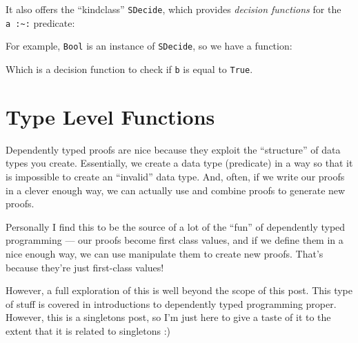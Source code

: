 \documentclass[]{article}
\newenvironment{Shaded}{}{}
\newcommand{\DataTypeTok}[1]{\textcolor[rgb]{0.56,0.13,0.00}{#1}}
\newcommand{\FunctionTok}[1]{\textcolor[rgb]{0.02,0.16,0.49}{#1}}
\newcommand{\KeywordTok}[1]{\textcolor[rgb]{0.00,0.44,0.13}{\textbf{#1}}}
\newcommand{\NormalTok}[1]{#1}
\newcommand{\OtherTok}[1]{\textcolor[rgb]{0.00,0.44,0.13}{#1}}
\begin{document}
It also offers the ``kindclass'' \texttt{SDecide}, which provides \emph{decision
functions} for the \texttt{a\ :\textasciitilde{}:} predicate:

\begin{Shaded}
\end{Shaded}

For example, \texttt{Bool} is an instance of \texttt{SDecide}, so we have a
function:

\begin{Shaded}
\end{Shaded}

Which is a decision function to check if \texttt{b} is equal to
\texttt{\textquotesingle{}True}.

\hypertarget{type-level-functions}{%
\section{Type Level Functions}\label{type-level-functions}}

Dependently typed proofs are nice because they exploit the ``structure'' of data
types you create. Essentially, we create a data type (predicate) in a way so
that it is impossible to create an ``invalid'' data type. And, often, if we
write our proofs in a clever enough way, we can actually use and combine proofs
to generate new proofs.

Personally I find this to be the source of a lot of the ``fun'' of dependently
typed programming --- our proofs become first class values, and if we define
them in a nice enough way, we can use manipulate them to create new proofs.
That's because they're just first-class values!

However, a full exploration of this is well beyond the scope of this post. This
type of stuff is covered in introductions to dependently typed programming
proper. However, this is a singletons post, so I'm just here to give a taste of
it to the extent that it is related to singletons :)
\end{document}
